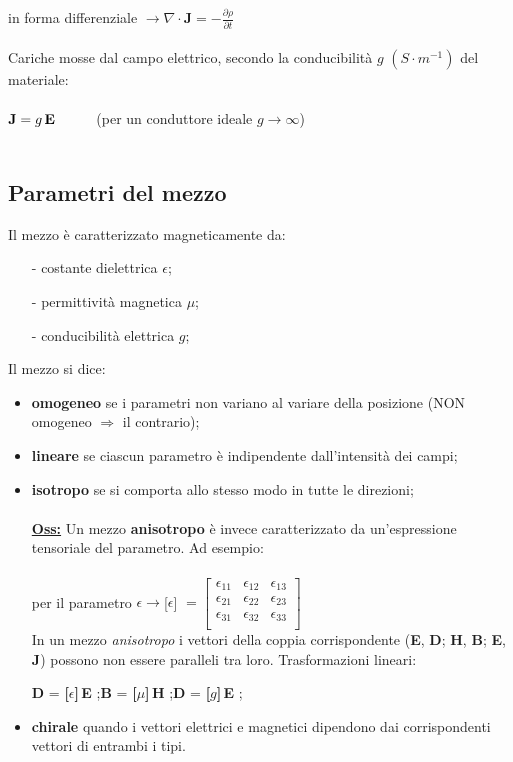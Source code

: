 \documentclass[a4paper]{article}
\begin{document}
in forma differenziale $\rightarrow \nabla\cdot\textbf{J} = -\frac{\partial\rho}{\partial t}$\\\\
Cariche mosse dal campo elettrico, secondo la conducibilità $g\,\,(S\cdot m^{-1})$ del materiale:\\\\

$\textbf{J} = g\,\textbf{E}\hspace{10mm} $(per un conduttore ideale $g\rightarrow\infty$)\\\\
\subsection*{Parametri del mezzo}
Il mezzo è caratterizzato magneticamente da:
\begin{itemize}
\item[-]costante dielettrica $\epsilon$;
\item[-]permittività magnetica $\mu$;
\item[-]conducibilità elettrica $g$;
\end{itemize}
Il mezzo si dice:
\begin{itemize}
\item\textbf{omogeneo} se i parametri non variano al variare della posizione (NON omogeneo $\Rightarrow$ il contrario);
\item\textbf{lineare} se ciascun parametro è indipendente dall'intensità dei campi;
\item\textbf{isotropo} se si comporta allo stesso modo in tutte le direzioni;\\\\
\underline{\textbf{Oss:}} Un mezzo \textbf{anisotropo} è invece caratterizzato da un'espressione tensoriale del parametro. Ad esempio:\\\\
per il parametro $\epsilon \rightarrow$\hspace{4mm}[\textbf{$\epsilon$}] $ = \begin{bmatrix}
\epsilon_{11} & \epsilon_{12} & \epsilon_{13}\\
\epsilon_{21} & \epsilon_{22} & \epsilon_{23}\\
\epsilon_{31} & \epsilon_{32} & \epsilon_{33}\\
\end{bmatrix}$\\
In un mezzo \emph{anisotropo} i vettori della coppia corrispondente (\textbf{E}, \textbf{D}; \textbf{H}, \textbf{B}; \textbf{E}, \textbf{J}) possono non essere paralleli tra loro. Trasformazioni lineari:\\
\begin{center}
\textbf{D} = \textbf{[$\epsilon$]$\,$E} ;\hspace{5mm}\textbf{B} = \textbf{[$\mu$]$\,$H} ;\hspace{5mm}\textbf{D} = \textbf{[$g$]$\,$E} ;
\end{center}
\item\textbf{chirale} quando i vettori elettrici e magnetici dipendono dai corrispondenti vettori di entrambi i tipi.
\end{itemize}
\end{document}
